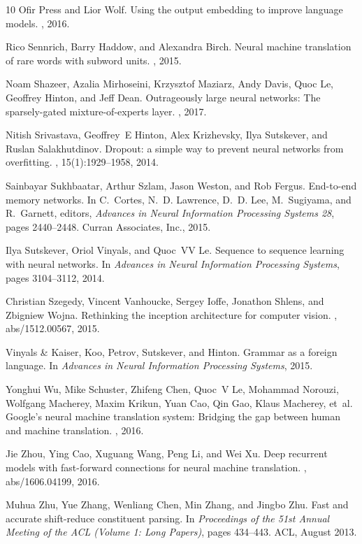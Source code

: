 \documentclass{article}
\begin{document}
\begin{thebibliography}{10}
Ofir Press and Lior Wolf.
\newblock Using the output embedding to improve language models.
, 2016.

Rico Sennrich, Barry Haddow, and Alexandra Birch.
\newblock Neural machine translation of rare words with subword units.
, 2015.

Noam Shazeer, Azalia Mirhoseini, Krzysztof Maziarz, Andy Davis, Quoc Le,
  Geoffrey Hinton, and Jeff Dean.
\newblock Outrageously large neural networks: The sparsely-gated
  mixture-of-experts layer.
, 2017.

Nitish Srivastava, Geoffrey~E Hinton, Alex Krizhevsky, Ilya Sutskever, and
  Ruslan Salakhutdinov.
\newblock Dropout: a simple way to prevent neural networks from overfitting.
, 15(1):1929--1958, 2014.

Sainbayar Sukhbaatar, Arthur Szlam, Jason Weston, and Rob Fergus.
\newblock End-to-end memory networks.
\newblock In C.~Cortes, N.~D. Lawrence, D.~D. Lee, M.~Sugiyama, and R.~Garnett,
  editors, {\em Advances in Neural Information Processing Systems 28}, pages
  2440--2448. Curran Associates, Inc., 2015.

Ilya Sutskever, Oriol Vinyals, and Quoc~VV Le.
\newblock Sequence to sequence learning with neural networks.
\newblock In {\em Advances in Neural Information Processing Systems}, pages
  3104--3112, 2014.

Christian Szegedy, Vincent Vanhoucke, Sergey Ioffe, Jonathon Shlens, and
  Zbigniew Wojna.
\newblock Rethinking the inception architecture for computer vision.
, abs/1512.00567, 2015.

{Vinyals {\&} Kaiser}, Koo, Petrov, Sutskever, and Hinton.
\newblock Grammar as a foreign language.
\newblock In {\em Advances in Neural Information Processing Systems}, 2015.

Yonghui Wu, Mike Schuster, Zhifeng Chen, Quoc~V Le, Mohammad Norouzi, Wolfgang
  Macherey, Maxim Krikun, Yuan Cao, Qin Gao, Klaus Macherey, et~al.
\newblock Google's neural machine translation system: Bridging the gap between
  human and machine translation.
, 2016.

Jie Zhou, Ying Cao, Xuguang Wang, Peng Li, and Wei Xu.
\newblock Deep recurrent models with fast-forward connections for neural
  machine translation.
, abs/1606.04199, 2016.

Muhua Zhu, Yue Zhang, Wenliang Chen, Min Zhang, and Jingbo Zhu.
\newblock Fast and accurate shift-reduce constituent parsing.
\newblock In {\em Proceedings of the 51st Annual Meeting of the ACL (Volume 1:
  Long Papers)}, pages 434--443. ACL, August 2013.

\end{thebibliography}
\end{document}
